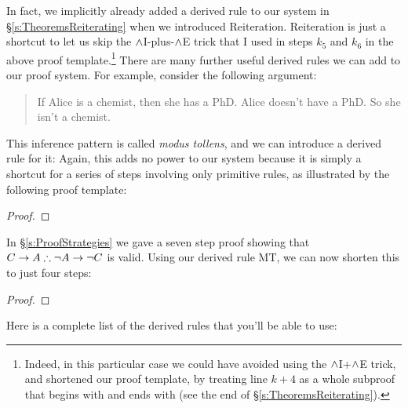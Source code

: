 In fact, we implicitly already added a derived rule to our system in \S\ref{s:TheoremsReiterating} when we introduced Reiteration.  Reiteration is just a shortcut to let us skip the $\wedge$I-plus-$\wedge$E trick that I used in steps $k_5$ and $k_6$ in the above proof template.\footnote{Indeed, in this particular case we could have avoided using the $\wedge$I+$\wedge$E trick, and shortened our proof template, by treating line $k+4$ as a whole subproof that begins with \meta{\psi} and ends with \meta{\psi} (see the end of \S\ref{s:TheoremsReiterating}).}  There are many further useful derived rules we can add to our proof system.  For example, consider the following argument:
	\begin{quote}
		If Alice is a chemist, then she has a PhD. Alice doesn't have a PhD. So she isn't a chemist.
	\end{quote}
This inference pattern is called \emph{modus tollens}, and we can introduce a derived rule for it:
Again, this adds no power to our system because it is simply a shortcut for a series of steps involving only primitive rules, as illustrated by the following proof template:
\begin{proof}
		\open
		\close
\end{proof}

In  \S\ref{s:ProofStrategies} we gave a seven step proof showing that $C \rightarrow A \therefore \neg A \rightarrow \neg C$ is valid.  Using our derived rule MT, we can now shorten this to just four steps:

\begin{proof}
  
\open
	 
	 
\close
{} 
\end{proof}
Here is a complete list of the derived rules that you'll be able to use:


